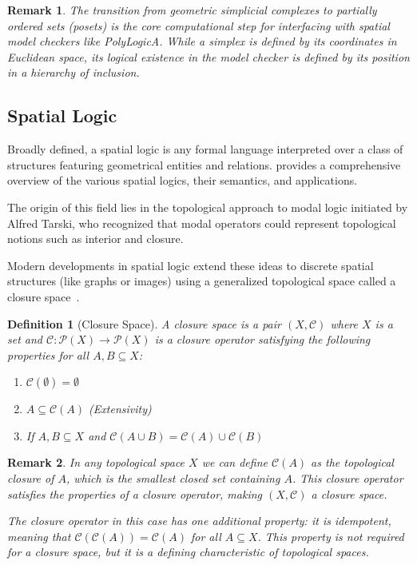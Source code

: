 \documentclass[11pt,a4paper]{article}
\newtheorem{definition}{Definition}
\newtheorem{remark}{Remark}
\begin{document}
\begin{remark} 
    The transition from geometric simplicial complexes to partially ordered sets (posets) is the core computational step for interfacing with spatial model checkers like PolyLogicA. While a simplex is defined by its coordinates in Euclidean space, its logical existence in the model checker is defined by its position in a hierarchy of inclusion. 
\end{remark}

\subsection{Spatial Logic}

Broadly defined, a spatial logic is any formal language interpreted over a class of structures featuring geometrical entities and relations. \cite{spatial-logic} provides a comprehensive overview of the various spatial logics, their semantics, and applications.

The origin of this field lies in the topological approach to modal logic initiated by Alfred Tarski, who recognized that modal operators could represent topological notions such as interior and closure.

Modern developments in spatial logic extend these ideas to discrete spatial structures (like graphs or images) using a generalized topological space called a closure space~\cite{closure-spaces-lmcs}.
\begin{definition} [Closure Space]
    A closure space is a pair $(X, \mathcal{C})$ where $X$ is a set and $\mathcal{C}: \mathcal{P}(X) \to \mathcal{P}(X)$ is a closure operator satisfying the following properties for all $A, B \subseteq X$:
    \begin{enumerate}
        \item $\mathcal{C}(\emptyset) = \emptyset$
        \item $A \subseteq \mathcal{C}(A)$ (Extensivity)
        \item If $A, B \subseteq X$ and $\mathcal{C}(A \cup B) = \mathcal{C}(A) \cup \mathcal{C}(B)$ 
    \end{enumerate}
\end{definition}

\begin{remark}
    In any topological space $X$ we can define $\mathcal{C}(A)$ as the topological closure of $A$, which is the smallest closed set containing $A$. This closure operator satisfies the properties of a closure operator, making $(X, \mathcal{C})$ a closure space. 

    The closure operator in this case has one additional property: it is idempotent, meaning that $\mathcal{C}(\mathcal{C}(A)) = \mathcal{C}(A)$ for all $A \subseteq X$. This property is not required for a closure space, but it is a defining characteristic of topological spaces.
\end{remark}
\end{document}
